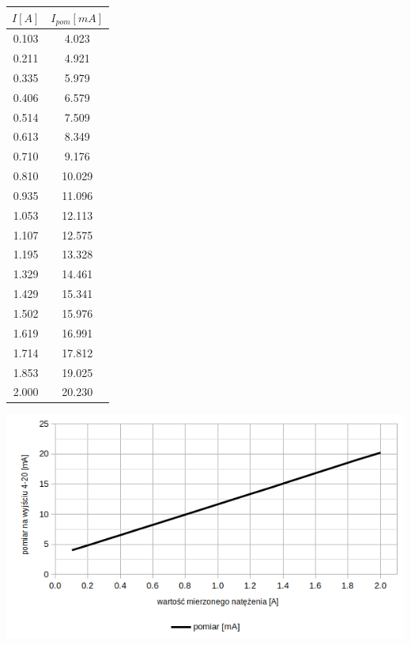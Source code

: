 \documentclass[12pt]{article}
\begin{document}
\begin{minipage}[c]{0.3\textwidth}
\centering
\begin{tabular}{|c|c|}
\hline
		\cellcolor[gray]{0.9}$I [A]$ & \cellcolor[gray]{0.9}$I_{pom} [mA]$ \\
		\hline
		0.103 & 4.023 \\
		\hline
		0.211 & 4.921 \\
		\hline
		0.335 & 5.979 \\
		\hline
		0.406 & 6.579 \\
		\hline
		0.514 & 7.509 \\
		\hline
		0.613 & 8.349 \\
		\hline
		0.710 & 9.176 \\
		\hline
		0.810 & 10.029 \\
		\hline
		0.935 & 11.096 \\
		\hline
		1.053 & 12.113 \\
		\hline
		1.107 & 12.575 \\
		\hline
		1.195 & 13.328 \\
		\hline
		1.329 & 14.461 \\
		\hline 
		1.429 & 15.341 \\
		\hline
		1.502 & 15.976 \\
		\hline
		1.619 & 16.991 \\
		\hline
		1.714 & 17.812 \\
		\hline
		1.853 & 19.025 \\
		\hline
		2.000 & 20.230 \\
		\hline
\end{tabular}
\end{minipage}
\begin{minipage}[c]{0.6\textwidth}
	\centering
	\includegraphics[width=\textwidth]{i_graph.png}
\end{minipage}
\end{document}
